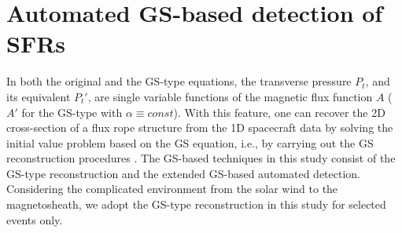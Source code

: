 


\section{Automated GS-based detection of SFRs}\label{sec:GS-detection}
In both the original and the GS-type equations, the transverse pressure $P_t$, and its equivalent $P_t'$, are single variable functions of the magnetic flux function $A$ ($A'$ for the GS-type with $\alpha\equiv const$). With this feature, one can recover the 2D cross-section of a flux rope structure from the 1D spacecraft data by solving the initial value problem based on the GS equation, i.e., by carrying out the GS reconstruction procedures \citep{Hau:1999, HuSonnerup:2002, Hu:2017}. The GS-based techniques in this study consist of the GS-type reconstruction and the extended GS-based automated detection. Considering the complicated environment from the solar wind to the magnetosheath, we adopt the GS-type reconstruction in this study for selected events only.

